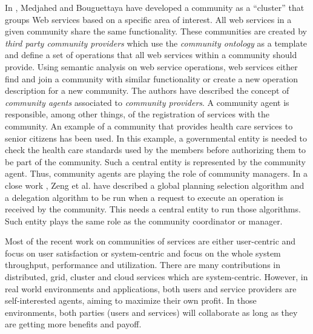 In \cite{Medjahed05adynamic}, Medjahed and Bouguettaya have
developed a community as a ``cluster'' that groups Web services
based on a specific area of interest. All web services in a given
community share the same functionality. These communities are
created by \emph{third party community providers} which use the
\emph{community ontology} as a template and define a set of
operations that all web services within a community should
provide. Using semantic analysis on web service operations, web
services either find and join a community with similar
functionality or create a new operation description for a new
community. The authors have described the concept of
\emph{community agents} associated to \emph{community providers}.
A community agent is responsible, among other things, of the
registration of services with the community. An example of a
community that provides health care services to senior citizens
has been used. In this example, a governmental entity is needed to
check the health care standards used by the members before
authorizing them to be part of the community. Such a central
entity is represented by the community agent. Thus, community
agents are playing the role of community managers. In a close work
\cite{Zeng:2003:QDW:775152.775211}, Zeng et al. have described a
global planning selection algorithm and a delegation algorithm to
be run when a request to execute an operation is received by the
community. This needs a central entity to run those algorithms.
Such entity plays the same role as the community coordinator or
manager.

Most of the recent work on communities of services are either
user-centric and focus on user satisfaction
\cite{Chun02user-centricperformance} or system-centric and focus
on the whole system throughput, performance and utilization. There
are many contributions in distributed, grid, cluster and cloud
services which are system-centric. However, in real world
environments and applications, both users and service providers
are self-interested agents, aiming to maximize their own profit.
In those environments, both parties (users and services) will
collaborate as long as they are getting more benefits and payoff.

